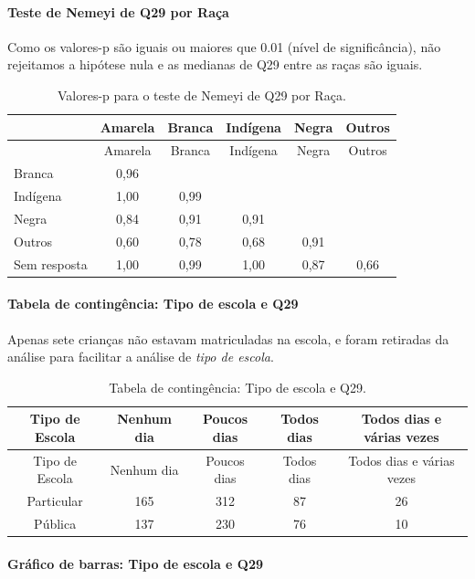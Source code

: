 \documentclass[]{article}
\let\oldparagraph\paragraph
\renewcommand{\paragraph}[1]{\oldparagraph{#1}\mbox{}}
\begin{document}
\hypertarget{teste-de-nemeyi-de-q29-por-rauxe7a}{%
\paragraph{Teste de Nemeyi de Q29 por Raça}\label{teste-de-nemeyi-de-q29-por-rauxe7a}}

Como os valores-p são iguais ou maiores que 0.01 (nível de significância), não rejeitamos a hipótese nula e as medianas de Q29 entre as raças são iguais.

\begin{longtable}[]{@{}lccccc@{}}
\caption{\label{tab:unnamed-chunk-937}Valores-p para o teste de Nemeyi de Q29 por Raça.}\tabularnewline
\toprule
& Amarela & Branca & Indígena & Negra & Outros\tabularnewline
\midrule
\endfirsthead
\toprule
& Amarela & Branca & Indígena & Negra & Outros\tabularnewline
\midrule
\endhead
Branca & 0,96 & & & &\tabularnewline
Indígena & 1,00 & 0,99 & & &\tabularnewline
Negra & 0,84 & 0,91 & 0,91 & &\tabularnewline
Outros & 0,60 & 0,78 & 0,68 & 0,91 &\tabularnewline
Sem resposta & 1,00 & 0,99 & 1,00 & 0,87 & 0,66\tabularnewline
\bottomrule
\end{longtable}

\cleardoublepage

\hypertarget{tabela-de-continguxeancia-tipo-de-escola-e-q29}{%
\paragraph{Tabela de contingência: Tipo de escola e Q29}\label{tabela-de-continguxeancia-tipo-de-escola-e-q29}}

Apenas sete crianças não estavam matriculadas na escola, e foram retiradas da análise para facilitar a análise de \emph{tipo de escola}.

\begin{longtable}[]{@{}ccccc@{}}
\caption{\label{tab:unnamed-chunk-938}Tabela de contingência: Tipo de escola e Q29.}\tabularnewline
\toprule
Tipo de Escola & Nenhum dia & Poucos dias & Todos dias & Todos dias e várias vezes\tabularnewline
\midrule
\endfirsthead
\toprule
Tipo de Escola & Nenhum dia & Poucos dias & Todos dias & Todos dias e várias vezes\tabularnewline
\midrule
\endhead
Particular & 165 & 312 & 87 & 26\tabularnewline
Pública & 137 & 230 & 76 & 10\tabularnewline
\bottomrule
\end{longtable}

\hypertarget{gruxe1fico-de-barras-tipo-de-escola-e-q29}{%
\paragraph{Gráfico de barras: Tipo de escola e Q29}\label{gruxe1fico-de-barras-tipo-de-escola-e-q29}}
\end{document}
